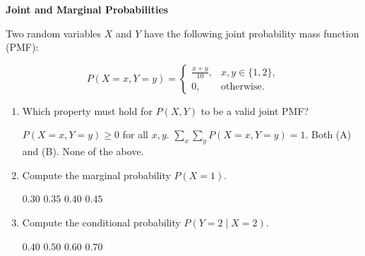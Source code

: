 \documentclass[12pt,letterpaper, onecolumn]{exam}
\begin{document}
\begin{questions}
\question[10 points]\textbf{Joint and Marginal Probabilities}\droppoints

Two random variables \( X \) and \( Y \) have the following joint probability mass function (PMF):

\[
P(X = x, Y = y) =
\begin{cases}
\frac{x + y}{10}, & x, y \in \{1, 2\}, \\
0, & \text{otherwise.}
\end{cases}
\]

\begin{enumerate}[label=(\alph*)]
    \item Which property must hold for \( P(X, Y) \) to be a valid joint PMF?
    \begin{choices}
        \choice \( P(X = x, Y = y) \geq 0 \) for all \( x, y \).
        \choice \( \sum_x \sum_y P(X = x, Y = y) = 1 \).
        \choice Both (A) and (B).
        \choice None of the above.
    \end{choices}

    \item Compute the marginal probability \( P(X = 1) \). 
    \begin{choices}
        \choice \( 0.30 \)
        \choice \( 0.35 \)
        \choice \( 0.40 \)
        \choice \( 0.45 \)
    \end{choices}

    \item Compute the conditional probability \( P(Y = 2 \mid X = 2) \).
    \begin{choices}
        \choice \( 0.40 \)
        \choice \( 0.50 \)
        \choice \( 0.60 \)
        \choice \( 0.70 \)
    \end{choices}
\end{enumerate}

\begin{solution}
    \begin{parts}
        \part 
        \part 
        \part 
    \end{parts}
\end{solution}


\end{questions}
\end{document}
